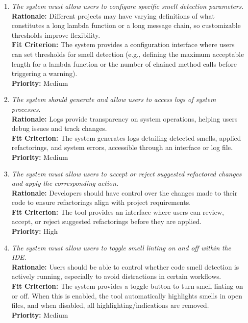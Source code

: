 \documentclass[12pt]{article}
\begin{document}
\begin{enumerate}[label=FR \arabic*., wide=0pt, leftmargin=*]
\item \emph{The system must allow users to configure specific smell detection parameters.}\\[2mm]
    {\bf Rationale:} Different projects may have varying definitions of what constitutes a long lambda function or a long message chain, so customizable thresholds improve flexibility.\\
    {\bf Fit Criterion:} The system provides a configuration interface where users can set thresholds for smell detection (e.g., defining the maximum acceptable length for a lambda function or the number of chained method calls before triggering a warning).\\
    {\bf Priority:} Medium

\item \emph{The system should generate and allow users to access logs of system processes.}\\[2mm]
    {\bf Rationale:} Logs provide transparency on system operations, helping users debug issues and track changes.\\
    {\bf Fit Criterion:} The system generates logs detailing detected smells, applied refactorings, and system errors, accessible through an interface or log file.\\
    {\bf Priority:} Medium

\item \emph{The system must allow users to accept or reject suggested refactored changes and apply the corresponding action.}\\[2mm]
    {\bf Rationale:} Developers should have control over the changes made to their code to ensure refactorings align with project requirements.\\
    {\bf Fit Criterion:} The tool provides an interface where users can review, accept, or reject suggested refactorings before they are applied.\\
    {\bf Priority:} High

\item \emph{The system must allow users to toggle smell linting on and off within the IDE.}\\[2mm]
    {\bf Rationale:} Users should be able to control whether code smell detection is actively running, especially to avoid distractions in certain workflows.\\
    {\bf Fit Criterion:} The system provides a toggle button to turn smell linting on or off. When this is enabled, the tool automatically highlights smells in open files, and when disabled, all highlighting/indications are removed.\\
    {\bf Priority:} Medium


\end{enumerate}
\end{document}
